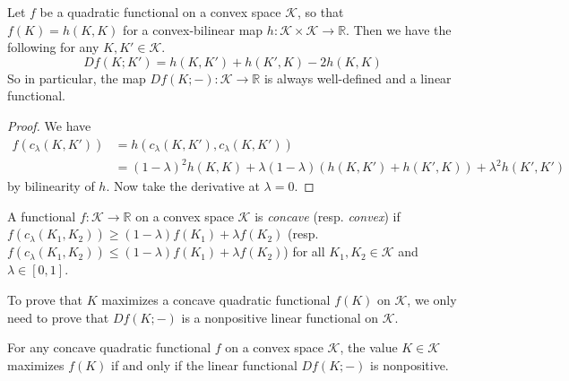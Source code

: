 \begin{lemma}

Let \(f\) be a quadratic functional on a convex space \(\mathcal{K}\), so that \(f(K) = h(K, K)\) for a convex-bilinear map \(h : \mathcal{K} \times \mathcal{K} \to \mathbb{R}\). Then we have the following for any \(K, K' \in \mathcal{K}\).
\[
Df(K; K') = h(K, K') + h(K', K) - 2 h (K, K)
\]
So in particular, the map \(Df(K; -) : \mathcal{K} \to \mathbb{R}\) is always well-defined and a linear functional.

\label{lem:derivative-calculation}
\end{lemma}

\begin{proof}
We have
\begin{equation}
\label{eqn:quadratic-functional}
\begin{split}
f(c_\lambda(K, K')) & = h(c_\lambda(K, K'), c_\lambda(K, K')) \\
& = (1 - \lambda)^2 h(K, K) + \lambda (1 - \lambda) \left( h(K, K') + h (K', K) \right) + \lambda^2 h(K', K')
\end{split}
\end{equation}
by bilinearity of \(h\). Now take the derivative at \(\lambda = 0\).
\end{proof}

\begin{definition}

A functional \(f : \mathcal{K} \to \mathbb{R}\) on a convex space \(\mathcal{K}\) is \emph{concave} (resp. \emph{convex}) if \(f(c_\lambda(K_1, K_2)) \geq (1 - \lambda) f(K_1) + \lambda f(K_2)\) (resp. \(f(c_\lambda(K_1, K_2)) \leq (1 - \lambda) f(K_1) + \lambda f(K_2)\)) for all \(K_1, K_2 \in \mathcal{K}\) and \(\lambda \in [0, 1]\).

\label{def:convex-space-concavity}
\end{definition}

To prove that \(K\) maximizes a concave quadratic functional \(f(K)\) on \(\mathcal{K}\), we only need to prove that \(Df(K; -)\) is a nonpositive linear functional on \(\mathcal{K}\).

\begin{theorem}

For any concave quadratic functional \(f\) on a convex space \(\mathcal{K}\), the value \(K \in \mathcal{K}\) maximizes \(f(K)\) if and only if the linear functional \(Df(K; -)\) is nonpositive.

\label{thm:quadratic-variation}
\end{theorem}


